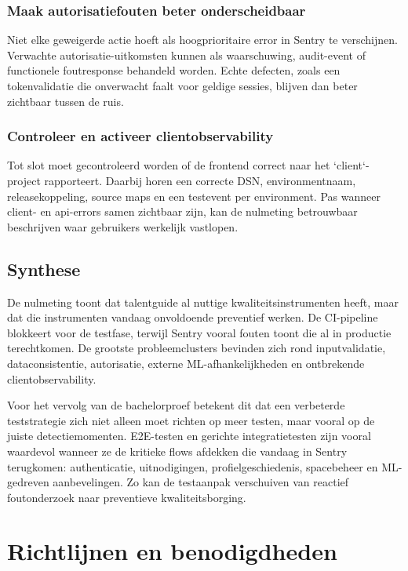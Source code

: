 \subsection{Maak autorisatiefouten beter onderscheidbaar}

Niet elke geweigerde actie hoeft als hoogprioritaire error in Sentry te verschijnen. Verwachte autorisatie-uitkomsten kunnen als waarschuwing, audit-event of functionele foutresponse behandeld worden. Echte defecten, zoals een tokenvalidatie die onverwacht faalt voor geldige sessies, blijven dan beter zichtbaar tussen de ruis.

\subsection{Controleer en activeer clientobservability}

Tot slot moet gecontroleerd worden of de frontend correct naar het `client`-project rapporteert. Daarbij horen een correcte DSN, environmentnaam, releasekoppeling, source maps en een testevent per environment. Pas wanneer client- en api-errors samen zichtbaar zijn, kan de nulmeting betrouwbaar beschrijven waar gebruikers werkelijk vastlopen.

\section{Synthese}

De nulmeting toont dat talentguide al nuttige kwaliteitsinstrumenten heeft, maar dat die instrumenten vandaag onvoldoende preventief werken. De CI-pipeline blokkeert voor de testfase, terwijl Sentry vooral fouten toont die al in productie terechtkomen. De grootste probleemclusters bevinden zich rond inputvalidatie, dataconsistentie, autorisatie, externe ML-afhankelijkheden en ontbrekende clientobservability.

Voor het vervolg van de bachelorproef betekent dit dat een verbeterde teststrategie zich niet alleen moet richten op meer testen, maar vooral op de juiste detectiemomenten. E2E-testen en gerichte integratietesten zijn vooral waardevol wanneer ze de kritieke flows afdekken die vandaag in Sentry terugkomen: authenticatie, uitnodigingen, profielgeschiedenis, spacebeheer en ML-gedreven aanbevelingen. Zo kan de testaanpak verschuiven van reactief foutonderzoek naar preventieve kwaliteitsborging.


\chapter{Richtlijnen en benodigdheden}
\label{ch:fase2}

